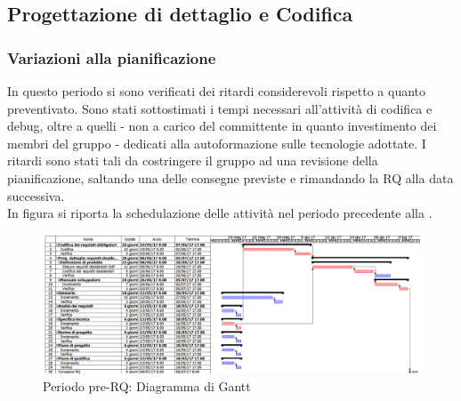\documentclass[../PianoDiProgetto.tex]{subfiles}
\begin{document}
	
	
	\subsection{Progettazione di dettaglio e Codifica}

	\subsubsection{Variazioni alla pianificazione}
	In questo periodo si sono verificati dei ritardi considerevoli rispetto a quanto preventivato. Sono stati sottostimati i tempi necessari all'attività di codifica e debug, oltre a quelli - non a carico del committente in quanto investimento dei membri del gruppo - dedicati alla autoformazione sulle tecnologie adottate. I ritardi sono stati tali da costringere il gruppo ad una revisione della pianificazione, saltando una delle consegne previste e rimandando la RQ alla data successiva.\\
	In figura si riporta la schedulazione delle attività nel periodo precedente alla \revisionediqualifica.
	\begin{figure}[H]
		\centering
		\includegraphics[scale=0.32]{Figures/toRQ}
		\caption{Periodo pre-RQ: Diagramma di Gantt}
	\end{figure}
\end{document}
